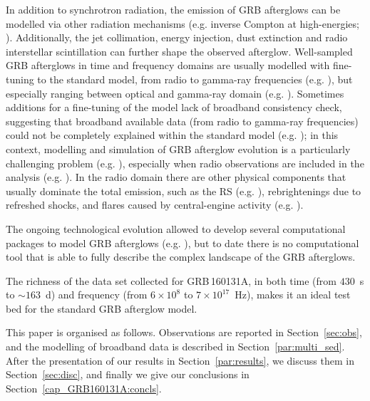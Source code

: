 \documentclass{aa}
\begin{document}
In addition to synchrotron radiation, the emission of GRB afterglows can be modelled via other radiation mechanisms (e.g. inverse Compton at high-energies; \citealt{MAGIC19b,Zhang20c}). 
Additionally, the jet collimation, energy injection, dust extinction and radio interstellar scintillation can further shape the observed afterglow.
Well-sampled GRB afterglows in time and frequency domains are usually modelled with fine-tuning to the standard model, from radio to gamma-ray frequencies (e.g. \citealt{Frail06,Laskar14,Perley14}), but especially ranging between optical and gamma-ray domain (e.g. \citealt{Lazzati02,Heyl03,Jakobsson05,Gendre06,CastroTirado07,Starling09,Zauderer13,Vanderhorst15}).
Sometimes additions for a fine-tuning of the model lack of broadband consistency check, suggesting that broadband available data (from radio to gamma-ray frequencies) could not be completely explained within the standard model (e.g. \citealt{Klotz08,Gendre10}); in this context, modelling and simulation of GRB afterglow evolution is a particularly challenging problem (e.g. \citealt{Granot07,Vaneerten18}), especially when radio observations are included in the analysis (e.g. \citealt{Frail00a, Frail00b,Frail03,Corsi05,Gendre10,Resmi12,Horesh15}).
In the radio domain there are other physical components that usually dominate the total emission, such as the RS (e.g. \citealt{Sari99,Kobayashi03a,Laskar13,Cucchiara15,Veres15,Laskar16,Alexander17,Laskar19b}), rebrightenings due to refreshed shocks, and flares caused by central-engine activity (e.g. \citealt{Bjornsson04,Zhang06,Melandri10,Chincarini10,Margutti10b}).

The ongoing technological evolution allowed to develop several computational packages to model GRB afterglows (e.g. \citealt{Rhoads99,Kobayashi99,Daigne00,Kumar03,Cannizzo04,Zhang09b,Vaneerten10a,Wygoda11,Vaneerten12b,DeColle12,Granot12,Laskar13,Leventis13,Rhodes20,Aksulu20,Ryan20,Ayache21}), but to date there is no computational tool that is able to fully describe the complex landscape of the GRB afterglows.

The richness of the data set collected for GRB\,160131A, in both time (from $430$~s to $\sim 163$~d) and frequency (from $6 \times 10^8$ to $7 \times 10^{17}$~Hz), makes it an ideal test bed for the standard GRB afterglow model.

This paper is organised as follows.
Observations are reported in Section~\ref{sec:obs}, and the modelling of broadband data is described in Section~\ref{par:multi_sed}.
After the presentation of our results in Section~\ref{par:results}, we discuss them in Section~\ref{sec:disc}, and finally we give our conclusions in Section~\ref{cap_GRB160131A:concls}.
\end{document}
